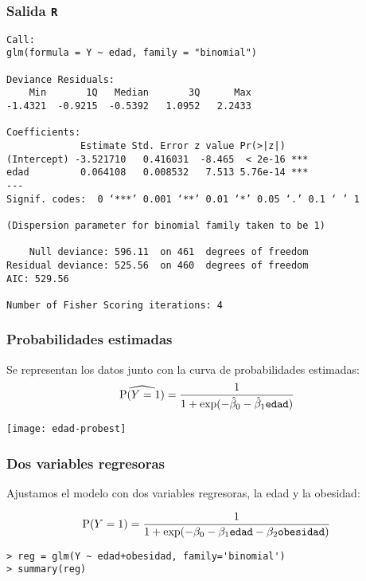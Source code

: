 \documentclass{beamer}
\begin{document}
\begin{frame}
\frametitle{Salida {\tt R}}

{\scriptsize
\begin{verbatim}
Call:
glm(formula = Y ~ edad, family = "binomial")

Deviance Residuals: 
    Min       1Q   Median       3Q      Max  
-1.4321  -0.9215  -0.5392   1.0952   2.2433  

Coefficients:
             Estimate Std. Error z value Pr(>|z|)    
(Intercept) -3.521710   0.416031  -8.465  < 2e-16 ***
edad         0.064108   0.008532   7.513 5.76e-14 ***
---
Signif. codes:  0 ‘***’ 0.001 ‘**’ 0.01 ‘*’ 0.05 ‘.’ 0.1 ‘ ’ 1 

(Dispersion parameter for binomial family taken to be 1)

    Null deviance: 596.11  on 461  degrees of freedom
Residual deviance: 525.56  on 460  degrees of freedom
AIC: 529.56

Number of Fisher Scoring iterations: 4
\end{verbatim}
}

\end{frame}
\begin{frame}
\frametitle{Probabilidades estimadas}

Se representan los datos junto con la curva de probabilidades
estimadas:
\[
\widehat{\mbox{P}(Y=1)} =
\frac{1}{1+\exp(-\hat{\beta}_0-\hat{\beta}_1\mbox{{\tt edad}})}
\]

\centerline{\texttt{[image: edad-probest]}}

\end{frame}
\begin{frame}
\frametitle{Dos variables regresoras}

Ajustamos el modelo con dos variables regresoras, la edad y la obesidad:

\[
\mbox{P}(Y=1) =
\frac{1}{1+\exp(-\beta_0-\beta_1\mbox{{\tt edad}}-\beta_2\mbox{{\tt obesidad}})}
\]

\begin{verbatim}
> reg = glm(Y ~ edad+obesidad, family='binomial')
> summary(reg)
\end{verbatim}

\end{frame}
\end{document}
